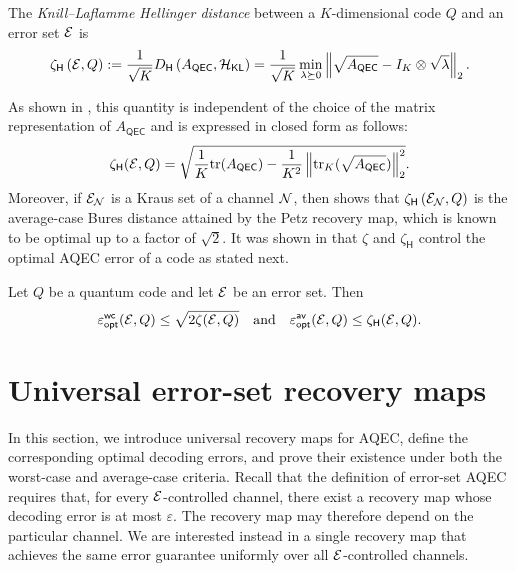 \documentclass[10pt]{article}
\newcommand{\tr}{\mathrm{tr}}
\newcommand{\p}[1]{\left(#1\right)}
\newcommand{\norm}[1]{\left\|#1\right\|}
\newcommand{\s}[1]{\mathsf{#1}}
\begin{document}
\begin{definition} \label{def:KL_Hellinger_distance}
The \emph{Knill--Laflamme Hellinger distance} between a $K$-dimensional code $Q$ and an error set ${\cal E}$ is
\begin{equation}
\zeta_{\s{H}}\p{\calE,Q}
:=
\frac{1}{\sqrt{K}}
D_{\s{H}}\p{A_{\s{QEC}},\calH_{\s{KL}}}
=
\frac{1}{\sqrt{K}}
\min_{\lambda\succeq0}
\norm{\sqrt{A_{\s{QEC}}}-I_K\otimes\sqrt{\lambda}}_2.
\label{eq:KL_Hellinger_distance}
\end{equation}
\end{definition}

As shown in \cite[Section~3.2]{Elimelech2026Theory}, this quantity is independent of the choice of the matrix representation of $A_{\s{QEC}}$ and is expressed in closed form as follows:
\begin{equation}
    \zeta_{\s{H}}(\calE,Q)=\sqrt{\frac{1}{K}\tr(A_{\s{QEC}})-\frac{1}{K^2}\norm{\tr_K(\sqrt{A_{\s{QEC}}})}_2^2}. \label{eq:KLHdistanceExpression}
\end{equation} Moreover, if ${\cal E}_{{\cal N}}$ is a Kraus set of a channel ${\cal N}$, then \cite[Corollary~10]{Elimelech2026Theory} shows that $\zeta_{\s{H}}\p{\calE_{\calN},Q}$ is the average-case Bures distance attained by the Petz recovery map, which is known to be optimal \cite{barnum2002reversing} up to a factor of $\sqrt{2}$. It was shown in \cite{Elimelech2026Theory} that $\zeta$ and $\zeta_{\s{H}}$ control the optimal AQEC error of a code
as stated next.
\begin{theorem}\label{th:sufficientAQEC}
Let $Q$ be a quantum code and let ${\cal E}$ be an error set. Then 
\[\varepsilon_{\s{opt}}^{\s{wc}}(\calE,Q)\leq \sqrt{2\zeta(\calE,Q)} \quad \text{and}\quad \varepsilon_{\s{opt}}^{\s{av}}(\calE,Q)\leq \zeta_{\s{H}}(\calE,Q). \]
\end{theorem}

\section{Universal error-set recovery maps}
In this section, we introduce universal recovery maps for AQEC, define the corresponding optimal decoding errors, and prove their existence under both the worst-case and average-case criteria. Recall that the definition of error-set AQEC requires that, for every ${\cal E}$-controlled channel, there exist a recovery map whose decoding error is at most $\varepsilon$. The recovery map may therefore depend on the particular channel. We are interested instead in a single recovery map that achieves the same error guarantee uniformly over all ${\cal E}$-controlled channels. 
\end{document}
